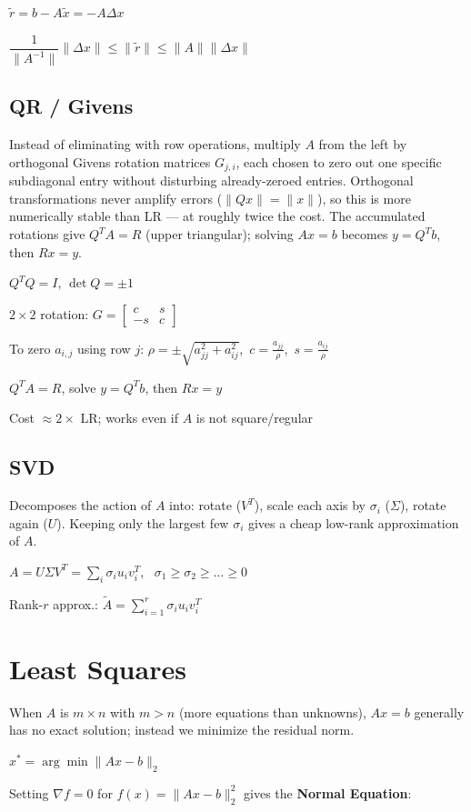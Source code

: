 \documentclass[11pt]{extarticle}
\begin{document}
$\tilde r=b-A\tilde x=-A\Delta x$

$\dfrac{1}{\|A^{-1}\|}\|\Delta x\|\le\|\tilde r\|\le\|A\|\|\Delta x\|$

\subsection{QR / Givens}
Instead of eliminating with row operations, multiply $A$ from the left by orthogonal Givens rotation matrices $G_{j,i}$, each chosen to zero out one specific subdiagonal entry without disturbing already-zeroed entries. Orthogonal transformations never amplify errors ($\|Qx\|=\|x\|$), so this is more numerically stable than LR --- at roughly twice the cost. The accumulated rotations give $Q^TA=R$ (upper triangular); solving $Ax=b$ becomes $y=Q^Tb$, then $Rx=y$.

$Q^TQ=I$, $\det Q=\pm1$

$2\times2$ rotation: $G=\begin{bmatrix}c&s\\-s&c\end{bmatrix}$

To zero $a_{i,j}$ using row $j$: $\rho=\pm\sqrt{a_{jj}^2+a_{ij}^2}$,\ $c=\tfrac{a_{jj}}{\rho}$,\ $s=\tfrac{a_{ij}}{\rho}$

$Q^TA=R$, solve $y=Q^Tb$, then $Rx=y$

Cost $\approx 2\times$ LR; works even if $A$ is not square/regular

\subsection{SVD}
Decomposes the action of $A$ into: rotate ($V^T$), scale each axis by $\sigma_i$ ($\Sigma$), rotate again ($U$). Keeping only the largest few $\sigma_i$ gives a cheap low-rank approximation of $A$.

$A=U\Sigma V^T=\sum_i\sigma_iu_iv_i^T$, \ $\sigma_1\ge\sigma_2\ge\dots\ge0$

Rank-$r$ approx.: $\tilde A=\sum_{i=1}^r\sigma_iu_iv_i^T$

\section{Least Squares}
When $A$ is $m\times n$ with $m>n$ (more equations than unknowns), $Ax=b$ generally has no exact solution; instead we minimize the residual norm.

$x^*=\arg\min\|Ax-b\|_2$

Setting $\nabla f=0$ for $f(x)=\|Ax-b\|_2^2$ gives the \textbf{Normal Equation}:
\end{document}
